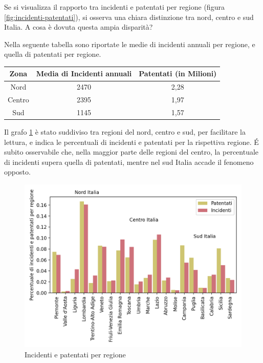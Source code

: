\documentclass[a4paper]{report}
\begin{document}
Se si visualizza il rapporto tra incidenti e patentati per regione (figura \ref{fig:incidenti-patentati}), 
si osserva una chiara distinzione tra nord, centro e sud Italia.
A cosa è dovuta questa ampia disparità?

Nella seguente tabella sono riportate le medie di incidenti annuali per regione, 
e quella di patentati per regione.

\begin{center}
    \def\arraystretch{1.5}%
    \begin{tabular}{ |c|c|c| } 
    \hline
    Zona & Media di Incidenti annuali & Patentati (in Milioni) \\ 
    \hline
    \rowcolor{TableGray}
    Nord    &   2470 &   2,28 \\ 
    Centro  &   2395 &   1,97 \\ 
    \rowcolor{TableGray}
    Sud     &   1145 &   1,57 \\ 
    \hline
    \end{tabular}
\end{center}

Il grafo \ref{fig:incidenti-patentati-bar} è stato suddiviso tra regioni del nord, 
centro e sud, per facilitare la lettura, e indica le percentuali di incidenti e patentati 
per la rispettiva regione. 
\'E subito osservabile che, nella maggior parte delle regioni del centro, 
la percentuale di incidenti supera quella di patentati, 
mentre nel sud Italia accade il fenomeno opposto.

\begin{figure}
    \includegraphics[width=\linewidth]{../src/incidenti/incidenti_aci/mappe_regioni/incidenti_patenti_bar.png}
    \caption{Incidenti e patentati per regione}
    \label{fig:incidenti-patentati-bar}
\end{figure}
\end{document}

